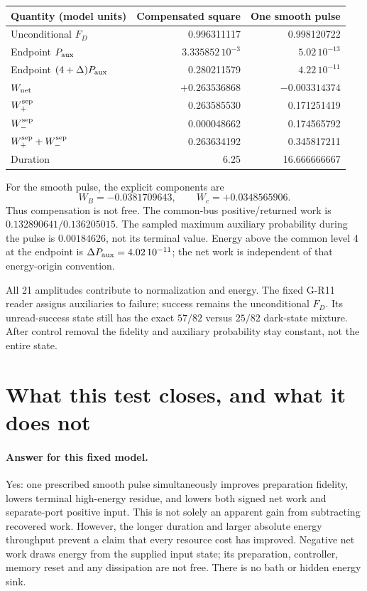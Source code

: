 \documentclass[11pt,a4paper]{article}
\begin{document}
\begin{center}\small
\begin{tabular}{lrr}\toprule
Quantity (model units) & Compensated square & One smooth pulse\\\midrule
Unconditional $F_D$ & 0.996311117 & 0.998120722\\
Endpoint $P_{\rm aux}$ & $3.335852\,10^{-3}$ & $5.02\,10^{-13}$\\
Endpoint $(4+\Delta)P_{\rm aux}$ & 0.280211579 & $4.22\,10^{-11}$\\
$W_{\rm net}$ & $+0.263536868$ & $-0.003314374$\\
$W_+^{\rm sep}$ & 0.263585530 & 0.171251419\\
$W_-^{\rm sep}$ & 0.000048662 & 0.174565792\\
$W_+^{\rm sep}+W_-^{\rm sep}$ & 0.263634192 & 0.345817211\\
Duration & 6.25 & 16.666666667\\\bottomrule
\end{tabular}
\end{center}
For the smooth pulse, the explicit components are
\begin{equation}
 W_B=-0.0381709643,\qquad W_c=+0.0348565906.
\end{equation}
Thus compensation is not free. The common-bus positive/returned work is
$0.132890641/0.136205015$. The sampled maximum auxiliary probability
during the pulse is $0.00184626$, not its terminal value. Energy above
the common level 4 at the endpoint is $\Delta P_{\rm aux}=4.02\,10^{-11}$;
the net work is independent of that energy-origin convention.

All 21 amplitudes contribute to normalization and energy. The fixed
G-R11 reader assigns auxiliaries to failure; success remains the
unconditional $F_D$. Its unread-success state still has the exact
$57/82$ versus $25/82$ dark-state mixture. After control removal the
fidelity and auxiliary probability stay constant, not the entire state.

\newpage
\section{What this test closes, and what it does not}
\paragraph{Answer for this fixed model.}
Yes: one prescribed smooth pulse simultaneously improves preparation
fidelity, lowers terminal high-energy residue, and lowers both signed
net work and separate-port positive input. This is not solely an
apparent gain from subtracting recovered work. However, the longer
duration and larger absolute energy throughput prevent a claim that
every resource cost has improved. Negative net work draws energy from
the supplied input state; its preparation, controller, memory reset
and any dissipation are not free. There is no bath or hidden energy sink.
\end{document}
